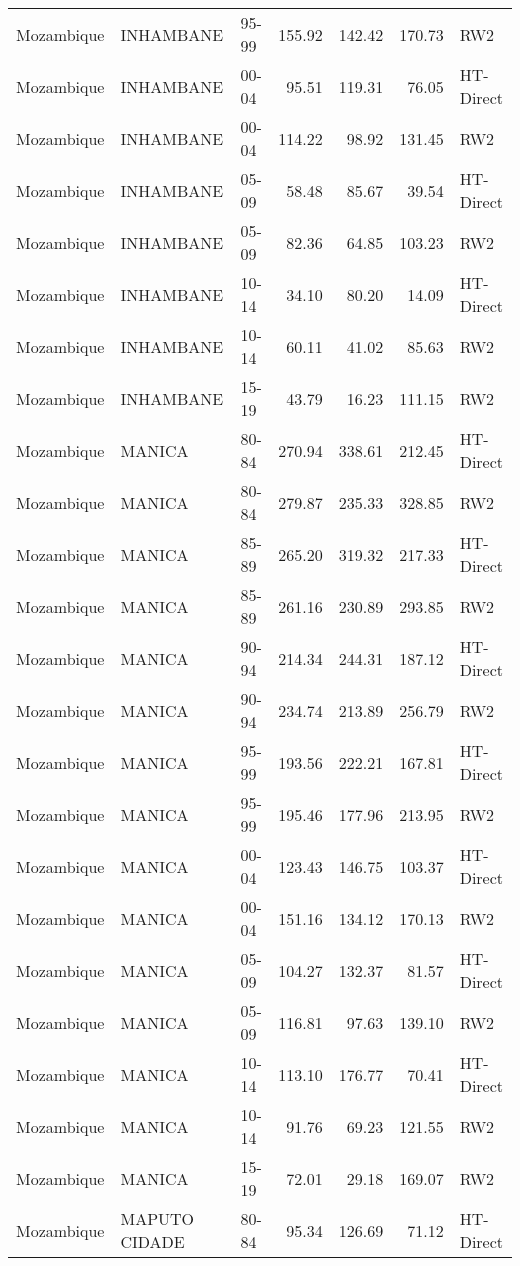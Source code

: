 \begin{longtable}{lllrrrl}
  Mozambique & INHAMBANE & 95-99 & 155.92 & 142.42 & 170.73 & RW2 \\ 
  Mozambique & INHAMBANE & 00-04 & 95.51 & 119.31 & 76.05 & HT-Direct \\ 
  Mozambique & INHAMBANE & 00-04 & 114.22 & 98.92 & 131.45 & RW2 \\ 
  Mozambique & INHAMBANE & 05-09 & 58.48 & 85.67 & 39.54 & HT-Direct \\ 
  Mozambique & INHAMBANE & 05-09 & 82.36 & 64.85 & 103.23 & RW2 \\ 
  Mozambique & INHAMBANE & 10-14 & 34.10 & 80.20 & 14.09 & HT-Direct \\ 
  Mozambique & INHAMBANE & 10-14 & 60.11 & 41.02 & 85.63 & RW2 \\ 
  Mozambique & INHAMBANE & 15-19 & 43.79 & 16.23 & 111.15 & RW2 \\ 
  Mozambique & MANICA & 80-84 & 270.94 & 338.61 & 212.45 & HT-Direct \\ 
  Mozambique & MANICA & 80-84 & 279.87 & 235.33 & 328.85 & RW2 \\ 
  Mozambique & MANICA & 85-89 & 265.20 & 319.32 & 217.33 & HT-Direct \\ 
  Mozambique & MANICA & 85-89 & 261.16 & 230.89 & 293.85 & RW2 \\ 
  Mozambique & MANICA & 90-94 & 214.34 & 244.31 & 187.12 & HT-Direct \\ 
  Mozambique & MANICA & 90-94 & 234.74 & 213.89 & 256.79 & RW2 \\ 
  Mozambique & MANICA & 95-99 & 193.56 & 222.21 & 167.81 & HT-Direct \\ 
  Mozambique & MANICA & 95-99 & 195.46 & 177.96 & 213.95 & RW2 \\ 
  Mozambique & MANICA & 00-04 & 123.43 & 146.75 & 103.37 & HT-Direct \\ 
  Mozambique & MANICA & 00-04 & 151.16 & 134.12 & 170.13 & RW2 \\ 
  Mozambique & MANICA & 05-09 & 104.27 & 132.37 & 81.57 & HT-Direct \\ 
  Mozambique & MANICA & 05-09 & 116.81 & 97.63 & 139.10 & RW2 \\ 
  Mozambique & MANICA & 10-14 & 113.10 & 176.77 & 70.41 & HT-Direct \\ 
  Mozambique & MANICA & 10-14 & 91.76 & 69.23 & 121.55 & RW2 \\ 
  Mozambique & MANICA & 15-19 & 72.01 & 29.18 & 169.07 & RW2 \\ 
  Mozambique & MAPUTO CIDADE & 80-84 & 95.34 & 126.69 & 71.12 & HT-Direct \\ 

\end{longtable}
